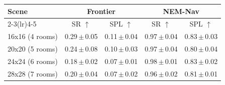 \begin{tabular}{l@{\hspace{6pt}}cccc}
\toprule
\textbf{Scene} & \multicolumn{2}{c}{\textbf{Frontier}} & \multicolumn{2}{c}{\textbf{NEM-Nav}} \\
\cmidrule(lr){2-3}\cmidrule(lr){4-5}
 & SR $\uparrow$ & SPL $\uparrow$ & SR $\uparrow$ & SPL $\uparrow$ \\
\midrule
16x16 (4 rooms) & 0.29\,$\pm$\,0.05 & 0.11\,$\pm$\,0.04 & 0.97\,$\pm$\,0.04 & 0.83\,$\pm$\,0.03 \\
20x20 (5 rooms) & 0.24\,$\pm$\,0.08 & 0.10\,$\pm$\,0.03 & 0.97\,$\pm$\,0.04 & 0.80\,$\pm$\,0.04 \\
24x24 (6 rooms) & 0.18\,$\pm$\,0.02 & 0.07\,$\pm$\,0.01 & 0.98\,$\pm$\,0.01 & 0.83\,$\pm$\,0.02 \\
28x28 (7 rooms) & 0.20\,$\pm$\,0.04 & 0.07\,$\pm$\,0.02 & 0.96\,$\pm$\,0.02 & 0.81\,$\pm$\,0.01 \\
\bottomrule
\end{tabular}
